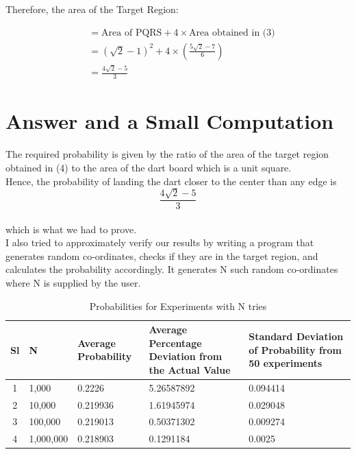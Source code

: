 \documentclass[10pt]{article}
\begin{document}
Therefore, the area of the Target Region:

\begin{equation}
\begin{split}
&= \text{Area of PQRS} + 4 \times \text{Area obtained in (3)}\\
&= {(\sqrt{2} - 1)}^2 + 4 \times \left(\frac{5\sqrt{2} - 7}{6}\right)\\
&= \frac{4\sqrt{2} - 5}{3}
\end{split}
\end{equation}
\newpage
\section{Answer and a Small Computation}
The required probability is given by the ratio of the area of the target region obtained in (4) to the area of the dart board which is a unit square.\\

Hence, the probability of landing the dart closer to the center than any edge is $$\frac{4\sqrt{2} - 5}{3}$$\\
which is what we had to prove.\\

I also tried to approximately verify our results by writing a program that generates random co-ordinates, checks if they are in the target region, and calculates the probability accordingly. It generates N such random co-ordinates where N is supplied by the user.\\

\begin{table}[H]
  \centering
  {\renewcommand{\arraystretch}{1.5}
  \renewcommand{\tabcolsep}{0.2cm}
  \begin{tabular}{c|p{1.5 cm}|p{2 cm}|p{3 cm}|p{3 cm}}
    Sl & N & Average Probability & Average Percentage Deviation from the Actual Value & Standard Deviation of Probability from 50 experiments\\
    \hline
    1 & 1,000 & 0.2226 & 5.26587892 & 0.094414\\
    2 & 10,000 & 0.219936 & 1.61945974 & 0.029048\\
    3 & 100,000 & 0.219013 & 0.50371302 & 0.009274\\
    4 & 1,000,000 & 0.218903 & 0.1291184 & 0.0025\\
  \end{tabular}}
  \caption{Probabilities for Experiments with N tries}
  \label{}
\end{table}
\end{document}

